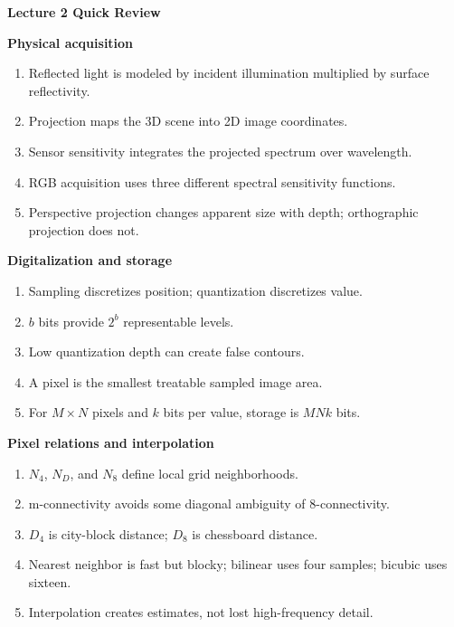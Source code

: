 \documentclass[11pt,a4paper,oneside]{report}
\newcommand{\reviewgroup}[1]{%
  \par\vspace{0.7em}%
  {\sffamily\bfseries\color{SapienzaRed}#1}\par\vspace{0.10em}%
}
\begin{document}
\clearpage
{}
{}
\begin{center}
{\sffamily\fontsize{22}{26}\selectfont\bfseries\color{Ink}Lecture 2 Quick Review\par}
\vspace{0.35em}{\color{SapienzaRed}\rule{0.82\textwidth}{0.8pt}}
\end{center}

\normalsize
\reviewgroup{Physical acquisition}
\begin{enumerate}[label=\textcolor{SapienzaRed}{\bfseries\arabic*.},leftmargin=1.8em,itemsep=0.40em]
\item Reflected light is modeled by incident illumination multiplied by surface reflectivity.
\item Projection maps the 3D scene into 2D image coordinates.
\item Sensor sensitivity integrates the projected spectrum over wavelength.
\item RGB acquisition uses three different spectral sensitivity functions.
\item Perspective projection changes apparent size with depth; orthographic projection does not.
\end{enumerate}
\reviewgroup{Digitalization and storage}
\begin{enumerate}[resume,label=\textcolor{SapienzaRed}{\bfseries\arabic*.},leftmargin=1.8em,itemsep=0.40em]
\item Sampling discretizes position; quantization discretizes value.
\item $b$ bits provide $2^b$ representable levels.
\item Low quantization depth can create false contours.
\item A pixel is the smallest treatable sampled image area.
\item For $M\times N$ pixels and $k$ bits per value, storage is $MNk$ bits.
\end{enumerate}
\reviewgroup{Pixel relations and interpolation}
\begin{enumerate}[resume,label=\textcolor{SapienzaRed}{\bfseries\arabic*.},leftmargin=1.8em,itemsep=0.40em]
\item $N_4$, $N_D$, and $N_8$ define local grid neighborhoods.
\item m-connectivity avoids some diagonal ambiguity of 8-connectivity.
\item $D_4$ is city-block distance; $D_8$ is chessboard distance.
\item Nearest neighbor is fast but blocky; bilinear uses four samples; bicubic uses sixteen.
\item Interpolation creates estimates, not lost high-frequency detail.
\end{enumerate}
\end{document}
